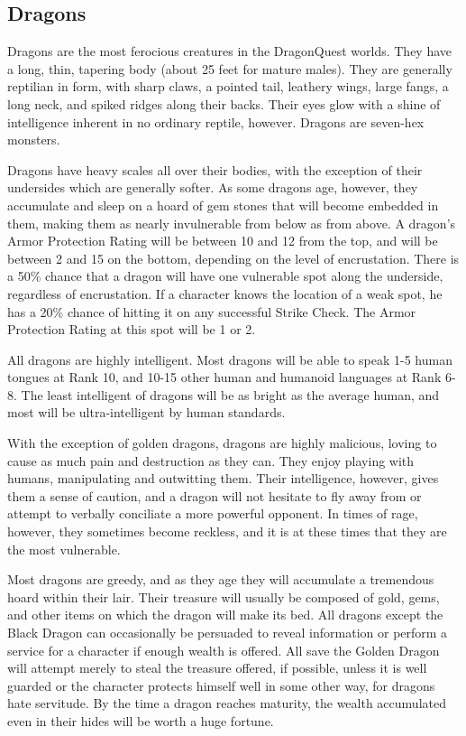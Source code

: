 \begin{multicols}{2}

\setlength\columnseprule{0.2mm}

\section{Dragons}
Dragons are the most ferocious creatures in the DragonQuest worlds.
They have a long, thin, tapering body (about 25 feet for mature
males).  They are generally reptilian in form, with sharp claws, a
pointed tail, leathery wings, large fangs, a long neck, and spiked
ridges along their backs. Their eyes glow with a shine of intelligence
inherent in no ordinary reptile, however.  Dragons are seven-hex
monsters.

Dragons have heavy scales all over their bodies, with the exception of
their undersides which are generally softer.  As some dragons age,
however, they accumulate and sleep on a hoard of gem stones that will
become embedded in them, making them as nearly invulnerable from below
as from above.  A dragon's Armor Protection Rating will be between 10
and 12 from the top, and will be between 2 and 15 on the bottom,
depending on the level of encrustation. There is a 50\% chance that a
dragon will have one vulnerable spot along the underside, regardless
of encrustation.  If a character knows the location of a weak spot, he
has a 20\% chance of hitting it on any successful Strike Check.  The
Armor Protection Rating at this spot will be 1 or 2.

All dragons are highly intelligent. Most dragons will be able to speak
1-5 human tongues at Rank 10, and 10-15 other human and humanoid
languages at Rank 6-8.  The least intelligent of dragons will be as
bright as the average human, and most will be ultra-intelligent by
human standards.

With the exception of golden dragons, dragons are highly malicious,
loving to cause as much pain and destruction as they can.  They enjoy
playing with humans, manipulating and outwitting them. Their
intelligence, however, gives them a sense of caution, and a dragon
will not hesitate to fly away from or attempt to verbally conciliate a
more powerful opponent.  In times of rage, however, they sometimes
become reckless, and it is at these times that they are the most
vulnerable.

Most dragons are greedy, and as they age they will accumulate a
tremendous hoard within their lair. Their treasure will usually be
composed of gold, gems, and other items on which the dragon will make
its bed. All dragons except the Black Dragon can occasionally be
persuaded to reveal information or perform a service for a character
if enough wealth is offered.  All save the Golden Dragon will attempt
merely to steal the treasure offered, if possible, unless it is well
guarded or the character protects himself well in some other way, for
dragons hate servitude.  By the time a dragon reaches maturity, the
wealth accumulated even in their hides will be worth a huge fortune.


\end{multicols}
